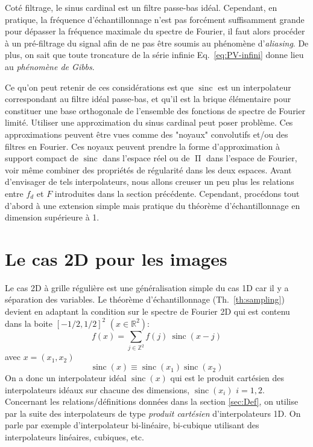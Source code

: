 \documentclass[11pt,twoside]{article}
\DeclareMathOperator{\sinc}{sinc}
\DeclareMathOperator{\boxcar}{{\mbox{$\Pi$}}}
\begin{document}
Coté filtrage, le sinus cardinal est un filtre passe-bas idéal. Cependant, en pratique, la fréquence d'échantillonnage n'est pas forcément suffisamment grande pour dépasser la fréquence maximale du spectre de Fourier, il faut alors procéder à un pré-filtrage du signal afin de ne pas être soumis au phénomène d'\textit{aliasing}. De plus, on sait que  toute troncature de la série infinie Eq.~\ref{eq:PV-infini} donne lieu  au \textit{phénomène de Gibbs}. 

Ce qu'on peut retenir de ces considérations est que $\sinc$ est un interpolateur correspondant au filtre idéal passe-bas, et qu'il est la brique élémentaire pour constituer une base orthogonale de l'ensemble des fonctions de spectre de Fourier limité. Utiliser une approximation du sinus cardinal peut poser problème. Ces approximations peuvent être vues comme des "noyaux" convolutifs et/ou des filtres en Fourier. Ces noyaux peuvent prendre la forme d'approximation à support compact de $\sinc$ dans l'espace réel ou de $\boxcar$ dans l'espace de Fourier, voir même combiner des propriétés de régularité dans les deux espaces. Avant d'envisager de tels interpolateurs, nous allons creuser un peu plus les relations entre $f_d$ et $F$ introduites dans la section précédente.  Cependant, procédons tout d'abord à une extension simple mais pratique du théorème d'échantillonnage en dimension supérieure à 1.
%
\section{Le cas 2D pour les images}
\label{sec:2D}
%
Le cas 2D à grille régulière est une généralisation simple du cas 1D car il y a séparation des variables. Le théorème d'échantillonnage (Th.~\ref{th:sampling}) devient en adaptant la condition sur le spectre de Fourier 2D qui est contenu dans la boite $[-1/2,1/2]^2$  $(x\in\mathbb{R}^2)$:
\begin{equation}
f(x) = \sum_{j\in\mathbb{Z}^2} f(j)\ \sinc(x-j)
\end{equation}
avec $x=(x_1,x_2)$
\begin{equation}
\sinc(x)\equiv \sinc(x_1)\sinc(x_2)
\end{equation}
On a donc un interpolateur idéal $\sinc(x)$ qui est le produit cartésien des interpolateurs idéaux sur chacune des dimensions, $\sinc(x_i)$ $i=1,2$. Concernant les relations/définitions données dans la section \ref{sec:Def}, on utilise par la suite des interpolateurs de type \textit{produit cartésien} d'interpolateurs 1D. On parle par exemple d'interpolateur  bi-linéaire, bi-cubique utilisant des interpolateurs linéaires, cubiques, etc. 
%
\end{document}
